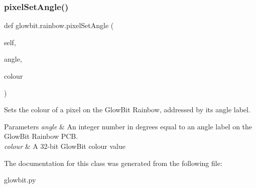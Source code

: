 \subsubsection{\texorpdfstring{pixel\+Set\+Angle()}{pixelSetAngle()}}
{\footnotesize\ttfamily def glowbit.\+rainbow.\+pixel\+Set\+Angle (\begin{DoxyParamCaption}\item[{}]{self,  }\item[{}]{angle,  }\item[{}]{colour }\end{DoxyParamCaption})}



Sets the colour of a pixel on the Glow\+Bit Rainbow, addressed by its angle label. 


\begin{DoxyParams}{Parameters}
{\em angle} & An integer number in degrees equal to an angle label on the Glow\+Bit Rainbow P\+CB. \\
\hline
{\em colour} & A 32-\/bit Glow\+Bit colour value \\
\hline
\end{DoxyParams}


The documentation for this class was generated from the following file\+:\begin{DoxyCompactItemize}
\item 
glowbit.\+py\end{DoxyCompactItemize}

